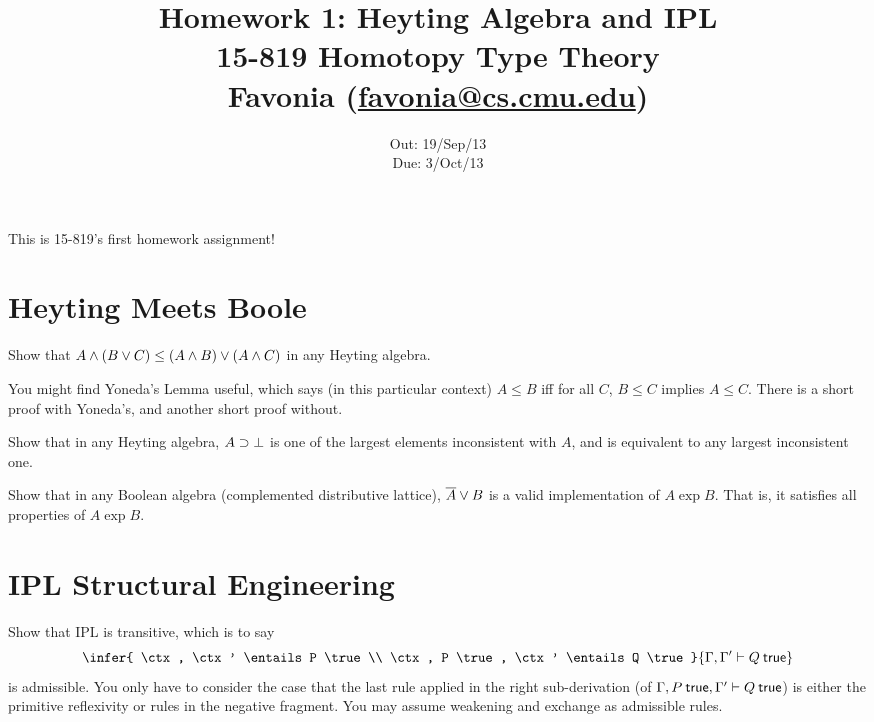 \documentclass[12pt]{article}
\title{\Large\textbf{
  Homework 1: Heyting Algebra and IPL}
\normalsize\\
15-819 Homotopy Type Theory\\
Favonia (\href{mailto:favonia@cs.cmu.edu}{favonia@cs.cmu.edu})}
\author{}
\date{%
Out: 19/Sep/13\\
Due: 3/Oct/13
}
\begin{document}
\maketitle

This is 15-819's first homework assignment!

\section{Heyting Meets Boole}

\begin{task}
  Show that $A \wedge (B \vee C) \leq (A \wedge B) \vee (A \wedge C)$
  in any Heyting algebra.

  \begin{hint}
    You might find Yoneda's Lemma useful, which says (in this particular context)
    $A \leq B$ iff for all $C$, $B \leq C$ implies $A \leq C$.
    There is a short proof with Yoneda's, and another short proof without.
  \end{hint}
\end{task}

\begin{task}
  Show that in any Heyting algebra,
  $A \supset \bot$ is one of the largest elements inconsistent with $A$,
  and is equivalent to any largest inconsistent one.
\end{task}

\begin{task}
  Show that in any Boolean algebra (complemented distributive lattice),
  $\overline{A} \vee B$ is a valid implementation of $A \exp B$.
  That is, it satisfies all properties of $A \exp B$.
\end{task}

\section{IPL Structural Engineering}

\begin{task}
  Show that IPL is transitive, which is to say
  \[
    \infer{
      \ctx, \ctx' \entails P \true
      \\
      \ctx, P \true, \ctx' \entails Q \true
    }{
      \ctx, \ctx' \entails Q \true
    }
  \]
  is admissible.
  You only have to consider the case that the last rule applied in the right sub-derivation
  (of $\ctx, P \true, \ctx' \entails Q \true$)
  is either the primitive reflexivity or rules in the negative fragment.
  You may assume weakening and exchange as admissible rules.
\end{task}
\end{document}

